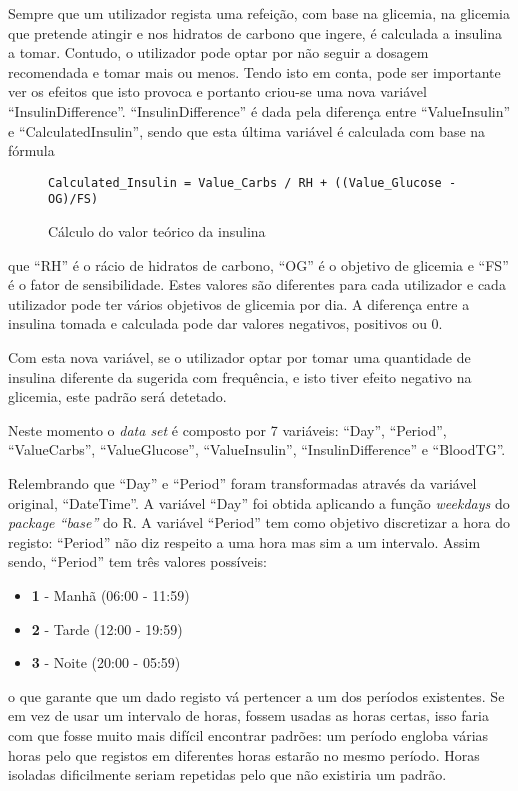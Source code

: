 Sempre que um utilizador regista uma refeição, com base na glicemia, na glicemia que pretende atingir e nos hidratos de carbono que ingere, é calculada a insulina a tomar. Contudo, o utilizador pode optar por não seguir a dosagem recomendada e tomar mais ou menos. Tendo isto em conta, pode ser importante ver os efeitos que isto provoca e portanto criou-se uma nova variável ``Insulin\textunderscore Difference''. ``Insulin\textunderscore Difference'' é dada pela diferença entre ``Value\textunderscore Insulin'' e ``Calculated\textunderscore Insulin'', sendo que esta última variável é calculada com base na fórmula

\begin{figure}
\begin{lstlisting}
Calculated_Insulin = Value_Carbs / RH + ((Value_Glucose - OG)/FS)

\end{lstlisting}
\label{fig:calculo}
\caption{Cálculo do valor teórico da insulina}
\end{figure}
que ``RH'' é o rácio de hidratos de carbono, ``OG''  é o objetivo de glicemia e ``FS''  é o fator de sensibilidade. Estes valores são diferentes para cada utilizador e cada utilizador pode ter vários objetivos de glicemia por dia. A diferença entre a insulina tomada e calculada pode dar valores negativos, positivos ou 0.

Com esta nova variável, se o utilizador optar por tomar uma quantidade de insulina diferente da sugerida com frequência, e isto tiver efeito negativo na glicemia, este padrão será detetado. 

Neste momento o \textit{data set} é composto por 7 variáveis: ``Day'', ``Period'', ``Value\textunderscore Carbs'', ``Value\textunderscore Glucose'', ``Value\textunderscore Insulin'', ``Insulin\textunderscore Difference'' e ``Blood\textunderscore TG''.



Relembrando que ``Day'' e ``Period'' foram transformadas através da variável original, ``DateTime''. A variável ``Day'' foi obtida aplicando a função \textit{weekdays} do \textit{package ``base''} do R. A variável ``Period'' tem como objetivo discretizar a hora do registo: ``Period'' não diz respeito a uma hora mas sim a um intervalo. Assim sendo, ``Period'' tem três valores possíveis:

\begin{itemize}
\item \textbf{1} - Manhã (06:00 - 11:59)
\item \textbf{2} - Tarde (12:00 - 19:59)
\item \textbf{3} - Noite (20:00 - 05:59)
\end{itemize}
o que garante que um dado registo vá pertencer a um dos períodos existentes. Se em vez de usar um intervalo de horas, fossem usadas as horas certas, isso faria com que fosse muito mais difícil encontrar padrões: um período engloba várias horas pelo que registos em diferentes horas estarão no mesmo período. Horas isoladas dificilmente seriam repetidas pelo que não existiria um padrão.


